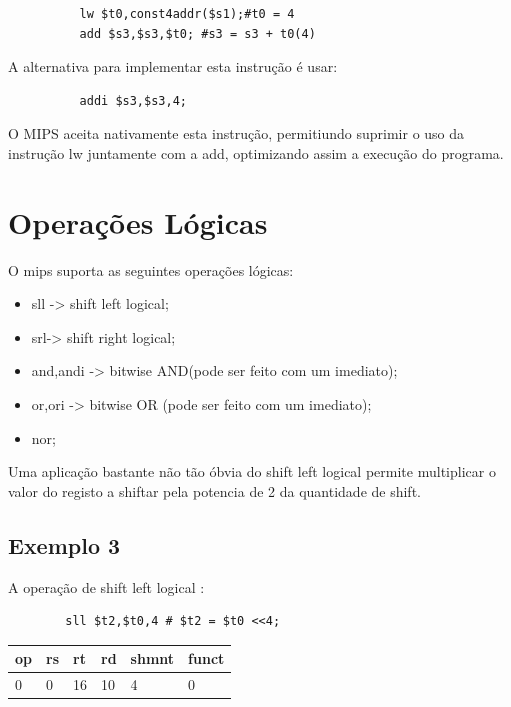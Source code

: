 \documentclass[10pt,a4paper]{book}
\begin{document}
		\begin{lstlisting}
		  lw $t0,const4addr($s1);#t0 = 4
		  add $s3,$s3,$t0; #s3 = s3 + t0(4)
		\end{lstlisting}

	      A alternativa para implementar esta instrução é usar:

		\begin{lstlisting}
		  addi $s3,$s3,4;
		\end{lstlisting}

	      O MIPS aceita nativamente esta instrução, permitiundo suprimir o uso da instrução lw juntamente com a add, optimizando assim a execução do programa.

	  \section{Operações Lógicas}

	    O mips suporta as seguintes operações lógicas:
	      \begin{itemize}
	       \item sll -> shift left logical;
	       \item srl-> shift right logical;
	       \item and,andi -> bitwise AND(pode ser feito com um imediato);
	       \item or,ori   -> bitwise OR (pode ser feito com um imediato);
	       \item nor;
	      \end{itemize}

	      Uma aplicação bastante não tão óbvia do shift left logical permite multiplicar o valor do registo a shiftar pela potencia de 2 da quantidade de shift.

	    \subsection{Exemplo 3}

	      A operação de shift left logical :

	      \begin{lstlisting}
		sll $t2,$t0,4 # $t2 = $t0 <<4;
	      \end{lstlisting}

	      \begin{center}
\begin{tabular}{|l|l|l|l|l|l|}\hline
op & rs & rt & rd & shmnt & funct\\\hline
0 & 0 & 16 & 10 & 4 & 0\\\hline
	      \end{tabular}
	      \end{center}
\end{document}
